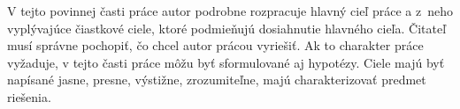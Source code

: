 \documentclass[../praca.tex]{subfiles}
\begin{document}
V tejto povinnej časti práce autor podrobne rozpracuje hlavný cieľ práce a
z~neho vyplývajúce čiastkové ciele, ktoré podmieňujú dosiahnutie hlavného cieľa.
Čitateľ musí správne pochopiť, čo chcel autor prácou vyriešiť. Ak to charakter
práce vyžaduje, v tejto časti práce môžu byť sformulované aj hypotézy. Ciele
majú byť napísané jasne, presne, výstižne, zrozumiteľne, majú charakterizovať
predmet riešenia.
\end{document}
